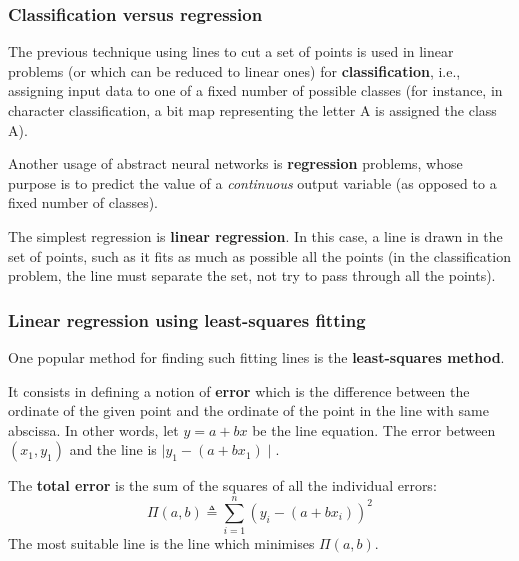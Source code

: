 %
\begin{frame}
\frametitle{Classification versus regression}

The previous technique using lines to cut a set of points is used in
linear problems (or which can be reduced to linear ones) for
\textbf{classification}, i.e., assigning input data to one of a fixed
number of possible classes (for instance, in character classification,
a bit map representing the letter A is assigned the class A).

\bigskip

Another usage of abstract neural networks is \textbf{regression}
problems, whose purpose is to predict the value of a \emph{continuous}
output variable (as opposed to a fixed number of classes).

\bigskip

The simplest regression is \textbf{linear regression}. In this case, a
line is drawn in the set of points, such as it fits as much as
possible all the points (in the classification problem, the line must
separate the set, not try to pass through all the points).

\end{frame}

%
\begin{frame}
\frametitle{Linear regression using
  least-squares fitting}

One popular method for finding such fitting lines is the
\textbf{least-squares method}.

\bigskip

It consists in defining a notion of \textbf{error} which is the
difference between the ordinate of the given point and the ordinate of
the point in the line with same abscissa. In other words, let \(y = a
+ b x\) be the line equation. The error between \((x_1,y_1)\) and the
line is \(\mid{y_1} - (a + b x_1)\mid\).

\bigskip

The \textbf{total error} is the sum of the squares of all the
individual errors:
\[
  \Pi(a,b) \triangleq \sum_{i=1}^{n}{(y_i - (a + b x_i))^2}
\]
The most suitable line is the line which minimises \(\Pi(a,b)\).

\end{frame}

